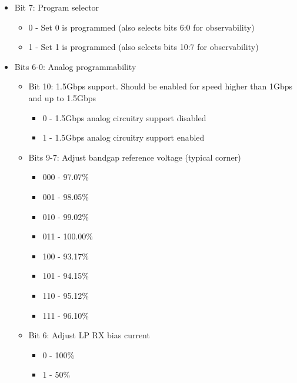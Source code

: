 \documentclass[main\_\_EN.tex]{subfiles}
\begin{document}
\begin{itemize}
        \begin{itemize}
            \item Bit 7: Program selector
                \begin{itemize}
                    \item 0 - Set 0 is programmed (also selects bits 6:0 for observability)
                    \item 1 - Set 1 is programmed (also selects bits 10:7 for observability)
                \end{itemize}
            \item Bits 6-0: Analog programmability
                \begin{itemize}
                    \item Bit 10: 1.5Gbps support. Should be enabled for speed higher than 1Gbps and up to 1.5Gbps
                        \begin{itemize}
                            \item 0 - 1.5Gbps analog circuitry support disabled
                            \item 1 - 1.5Gbps analog circuitry support enabled
                        \end{itemize}
                    \item Bits 9-7: Adjust bandgap reference voltage (typical corner)
                        \begin{itemize}
                            \item 000 - 97.07\%
                            \item 001 - 98.05\%
                            \item 010 - 99.02\%
                            \item 011 - 100.00\%
                            \item 100 - 93.17\%
                            \item 101 - 94.15\%
                            \item 110 - 95.12\%
                            \item 111 - 96.10\%
                        \end{itemize}
                    \item Bit 6: Adjust LP RX bias current
                        \begin{itemize}
                            \item 0 - 100\%
                            \item 1 - 50\%

\end{itemize}
\end{itemize}
\end{itemize}
\end{itemize}
\end{document}
